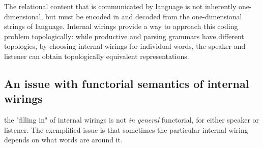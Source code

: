  The relational content that is communicated by language is not inherently one-dimensional, but must be encoded in and decoded from the one-dimensional strings of language. Internal wirings \citep{wang-mascianicaInternalWirings} provide a way to approach this coding problem topologically: while productive and parsing grammars have different topologies, by choosing internal wirings for individual words, the speaker and listener can obtain topologically equivalent representations.


\clearpage

\subsection{An issue with functorial semantics of internal wirings}

 the "filling in" of internal wirings is not \emph{in general} functorial, for either speaker or listener. The exemplified issue is that sometimes the particular internal wiring depends on what words are around it.

